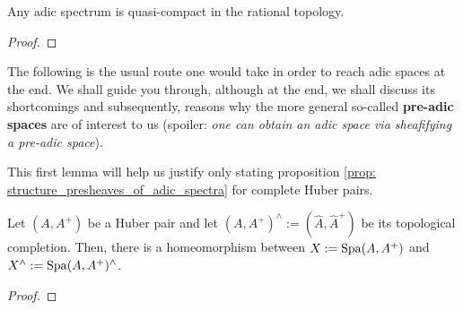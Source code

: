             \begin{corollary} \label{coro: adic_spectra_are_quasi_compact}
                Any adic spectrum is quasi-compact in the rational topology.
            \end{corollary}
                \begin{proof}
                    
                \end{proof}
            
            The following is the usual route one would take in order to reach adic spaces at the end. We shall guide you through, although at the end, we shall discuss its shortcomings and subsequently, reasons why the more general so-called \textbf{pre-adic spaces} are of interest to us (spoiler: \textit{one can obtain an adic space via sheafifying a pre-adic space}).
            
            This first lemma will help us justify only stating proposition \ref{prop: structure_presheaves_of_adic_spectra} for complete Huber pairs.
            \begin{lemma} \label{lemma: adic_spectra_of_complete_huber_pairs}
                Let $(A, A^+)$ be a Huber pair and let $(A, A^+)^{\wedge} := (\hat{A}, \hat{A}^+)$ be its topological completion. Then, there is a homeomorphism between $X := \mathrm{Spa}(A, A^+)$ and $X^{\wedge} := \mathrm{Spa}(A, A^+)^{\wedge}$.
            \end{lemma}
                \begin{proof}
                    
                \end{proof}
            
